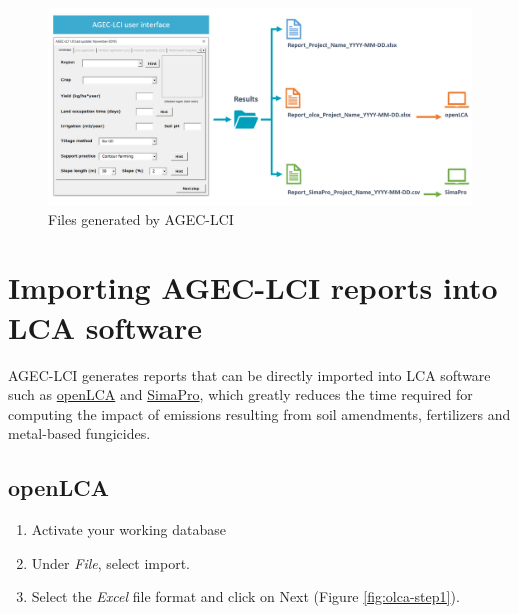 \documentclass[openany]{book}
\begin{document}
\begin{figure}[ht]

{\centering \includegraphics[width=0.95\linewidth]{Figures/age_lci_user_interface} 

}

\caption{Files generated by AGEC-LCI}\label{fig:agec-lci-step4}
\end{figure}

\hypertarget{importing-agec-lci-reports-into-lca-software}{%
\chapter{Importing AGEC-LCI reports into LCA software}\label{importing-agec-lci-reports-into-lca-software}}

AGEC-LCI generates reports that can be directly imported into LCA software such as \href{http://www.openlca.org/openlca/}{openLCA} and \href{https://simapro.com/}{SimaPro}, which greatly reduces the time required for computing the impact of emissions resulting from soil amendments, fertilizers and metal-based fungicides.

\hypertarget{import-olca}{%
\section{openLCA}\label{import-olca}}

\begin{enumerate}
\def\labelenumi{\arabic{enumi}.}
\item
  Activate your working database
\item
  Under \emph{File}, select import.
\item
  Select the \emph{Excel} file format and click on Next (Figure \ref{fig:olca-step1}).
\end{enumerate}
\end{document}
